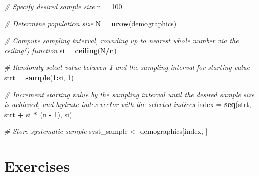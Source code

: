 \documentclass[]{book}
\newenvironment{Shaded}{\begin{snugshade}}{\end{snugshade}}
\newcommand{\CommentTok}[1]{\textcolor[rgb]{0.56,0.35,0.01}{\textit{#1}}}
\newcommand{\DecValTok}[1]{\textcolor[rgb]{0.00,0.00,0.81}{#1}}
\newcommand{\KeywordTok}[1]{\textcolor[rgb]{0.13,0.29,0.53}{\textbf{#1}}}
\newcommand{\NormalTok}[1]{#1}
\newcommand{\OperatorTok}[1]{\textcolor[rgb]{0.81,0.36,0.00}{\textbf{#1}}}
\newcommand{\StringTok}[1]{\textcolor[rgb]{0.31,0.60,0.02}{#1}}
\begin{document}
\begin{Shaded}
\begin{Highlighting}[]
\CommentTok{# Specify desired sample size}
\NormalTok{n =}\StringTok{ }\DecValTok{100}

\CommentTok{# Determine population size}
\NormalTok{N =}\StringTok{ }\KeywordTok{nrow}\NormalTok{(demographics)}

\CommentTok{# Compute sampling interval, rounding up to nearest whole number via the ceiling() function}
\NormalTok{si =}\StringTok{ }\KeywordTok{ceiling}\NormalTok{(N}\OperatorTok{/}\NormalTok{n)}

\CommentTok{# Randomly select value between 1 and the sampling interval for starting value}
\NormalTok{strt =}\StringTok{ }\KeywordTok{sample}\NormalTok{(}\DecValTok{1}\OperatorTok{:}\NormalTok{si, }\DecValTok{1}\NormalTok{)}

\CommentTok{# Increment starting value by the sampling interval until the desired sample size is achieved, and hydrate index vector with the selected indices}
\NormalTok{index =}\StringTok{ }\KeywordTok{seq}\NormalTok{(strt, strt }\OperatorTok{+}\StringTok{ }\NormalTok{si }\OperatorTok{*}\StringTok{ }\NormalTok{(n }\OperatorTok{-}\StringTok{ }\DecValTok{1}\NormalTok{), si)}

\CommentTok{# Store systematic sample}
\NormalTok{syst_sample <-}\StringTok{ }\NormalTok{demographics[index, ]}
\end{Highlighting}
\end{Shaded}

\hypertarget{exercises}{%
\section{Exercises}\label{exercises}}
\end{document}
